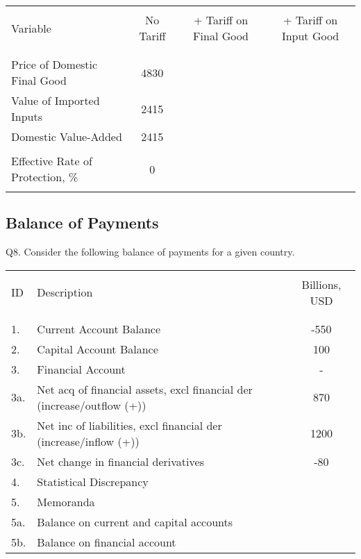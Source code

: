 \documentclass[12pt]{article}
\begin{document}
\begin{table}[!h]
	\centering
	\begin{tabular}[t]{l c c c}
		\hline
		&&&\\
		Variable & No Tariff & + Tariff on Final Good & + Tariff on Input Good \\
		&&&\\
		\hline
		&&&\\
		Price of Domestic Final Good & 4830 & & \\
		Value of Imported Inputs & 2415 & & \\
		Domestic Value-Added &	2415	&&\\
		&&&\\
		Effective Rate of Protection, \% &	0	&& \\
		&&&\\
		\hline
	\end{tabular}
\end{table}


\newpage

\subsection*{Balance of Payments}

\noindent Q8. Consider the following balance of payments for a given country.

\begin{table}[!h]
	\centering
	\begin{tabular}[t]{l l c }
		\hline
		&&\\
		ID & Description & Billions, USD \\
		&&\\
		\hline
		&&\\
		1. & Current Account Balance & -550\\
		2. & Capital Account Balance & 100\\
		3. & Financial Account	& -\\
		3a. & Net acq of financial assets, excl financial der (increase/outflow (+))& 870\\
		3b. & Net inc of liabilities, excl financial der (increase/inflow (+))	& 1200 \\
		3c. & Net change in financial derivatives & -80\\
		4. & Statistical Discrepancy & \\
		5. & Memoranda & \\
		5a. & Balance on current and capital accounts & \\
		5b. & Balance on financial account & \\
		\hline
	\end{tabular}
\end{table}
\end{document}
